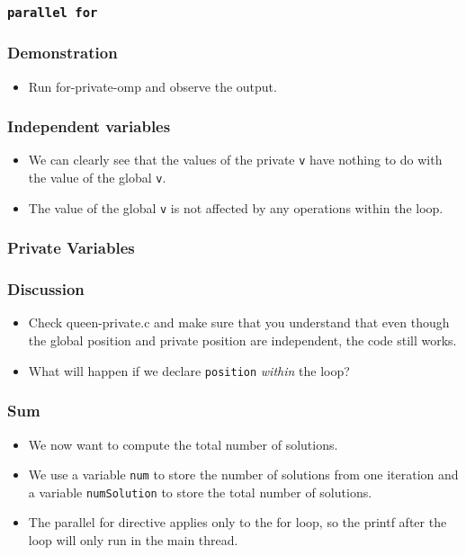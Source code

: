 \documentclass{beamer}
\begin{document}
\begin{frame}
\frametitle{\tt parallel for} 
\end{frame}

\begin{frame}
\frametitle{Demonstration}
\begin{itemize}
\item Run for-private-omp and observe the output.
\end{itemize}
\end{frame}

\begin{frame}
\frametitle{Independent variables}
\begin{itemize}
\item We can clearly see that the values of the private {\tt v} have
  nothing to do with the value of the global {\tt v}.
\item The value of the global {\tt v} is not affected by any
  operations within the loop.
\end{itemize}
\end{frame}

\begin{frame}
\frametitle{Private Variables}
\centerline{}
\end{frame}

\begin{frame}
\frametitle{Discussion}
\begin{itemize}
\item Check queen-private.c and make sure that you understand that
  even though the global position and private position are
  independent, the code still works.
\item What will happen if we declare {\tt position} {\em within} the
  loop?
\end{itemize}
\end{frame}



\begin{frame}
\frametitle{Sum}
\begin{itemize}
\item We now want to compute the total number of solutions.
\item We use a variable {\tt num} to store the number of solutions
  from one iteration and a variable {\tt numSolution} to store the total number of solutions.
\item The parallel for directive applies only to the for loop, so the
  printf after the loop will only run in the main thread.
\end{itemize}
\end{frame}
\end{document}

